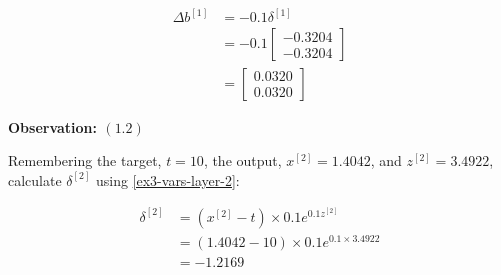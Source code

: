 \documentclass[12pt]{article}
\begin{document}
\begin{enumerate}[leftmargin=\labelsep]
\begin{paracol}{3}
\begin{footnotesize}
                  $$
                      \begin{aligned}
                          \Delta b^{[1]} & = -0.1 \delta^{[1]}   \\
                                         & = -0.1 \begin{bmatrix}
                                                      -0.3204 \\
                                                      -0.3204
                                                  \end{bmatrix} \\
                                         & = \begin{bmatrix}
                                                 0.0320 \\
                                                 0.0320
                                             \end{bmatrix}
                      \end{aligned}
                  $$
              \end{footnotesize}

              \switchcolumn

              \begin{center}
                  \textbf{Observation: $(1.2)$}
              \end{center}

              Remembering the target, $t = 10$,
              the output, $x^{[2]} = 1.4042$,
              and $z^{[2]} = 3.4922$,
              calculate $\delta^{[2]}$ using \eqref{ex3-vars-layer-2}:

              \begin{footnotesize}
                  $$
                      \begin{aligned}
                          \delta^{[2]} & = \left(x^{[2]} - t\right) \times 0.1 e^{0.1 z^{[2]}} \\
                                       & = (1.4042 - 10) \times 0.1 e^{0.1 \times 3.4922}      \\
                                       & = -1.2169
                      \end{aligned}
                  $$
              \end{footnotesize}


\end{paracol}
\end{enumerate}
\end{document}
